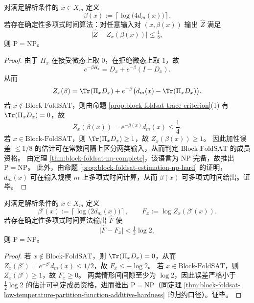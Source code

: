 \begin{theorem}[低温配分函数的常数加性精度近似强迫 \texorpdfstring{$P=NP$}{P=NP}]\label{thm:block-foldsat-low-temperature-partition-function-additive-hardness}
对满足解析条件的 \(x\in X_m\) 定义
\[
\beta(x):=\left\lceil\log\bigl(4d_m(x)\bigr)\right\rceil.
\]
若存在确定性多项式时间算法：对任意输入对 \((x,\beta(x))\) 输出 \(\widehat Z\) 满足
\[
\bigl|\widehat Z-Z_x(\beta(x))\bigr|\le \tfrac18,
\]
则 \(\mathrm{P}=\mathrm{NP}\)。
\end{theorem}
\begin{proof}
由于 \(H_x\) 在接受微态上取 \(0\)，在拒绝微态上取 \(1\)，故
\[
e^{-\beta H_x}=D_x+e^{-\beta}(I-D_x).
\]
从而
\[
Z_x(\beta)=\Tr(\Pi_xD_x)+e^{-\beta}\bigl(d_m(x)-\Tr(\Pi_xD_x)\bigr).
\]
若 \(x\notin\mathrm{Block}\text{-}\mathrm{FoldSAT}\)，则由命题 \ref{prop:block-foldsat-trace-criterion}(1) 有 \(\Tr(\Pi_xD_x)=0\)，故
\[
Z_x(\beta(x))=e^{-\beta(x)}d_m(x)\le \frac{1}{4}.
\]
若 \(x\in\mathrm{Block}\text{-}\mathrm{FoldSAT}\)，则 \(\Tr(\Pi_xD_x)\ge 1\)，故 \(Z_x(\beta(x))\ge 1\)。
因此加性误差 \(\le 1/8\) 的估计可在常数间隔上区分两类输入，从而判定 \(\mathrm{Block}\text{-}\mathrm{FoldSAT}\) 的成员资格。
由定理 \ref{thm:block-foldsat-np-complete}，该语言为 NP 完备，故推出 \(\mathrm{P}=\mathrm{NP}\)。
此外，由命题 \ref{prop:block-foldsat-estimation-np-hard} 的证明，\(d_m(x)\) 可在输入规模 \(m\) 上多项式时间计算，从而 \(\beta(x)\) 可多项式时间给出。证毕。
\end{proof}

\begin{corollary}[自由能的常数精度近似亦为 NP 困难]\label{cor:block-foldsat-free-energy-additive-hardness}
对满足解析条件的 \(x\in X_m\) 定义
\[
\beta'(x):=\left\lceil\log\bigl(2d_m(x)\bigr)\right\rceil,
\qquad
F_x:=\log Z_x(\beta'(x)).
\]
若存在确定性多项式时间算法输出 \(\widehat F\) 使
\[
\bigl|\widehat F-F_x\bigr|<\tfrac12\log 2,
\]
则 \(\mathrm{P}=\mathrm{NP}\)。
\end{corollary}
\begin{proof}
若 \(x\notin\mathrm{Block}\text{-}\mathrm{FoldSAT}\)，则 \(\Tr(\Pi_xD_x)=0\)，从而
\(
Z_x(\beta')=e^{-\beta'}d_m(x)\le 1/2
\)，故 \(F_x\le -\log 2\)。
若 \(x\in\mathrm{Block}\text{-}\mathrm{FoldSAT}\)，则 \(Z_x(\beta')\ge 1\)，故 \(F_x\ge 0\)。
两类情形间间隙至少为 \(\log 2\)，因此误差严格小于 \(\tfrac12\log 2\) 的估计可判定成员资格，进而推出 \(\mathrm{P}=\mathrm{NP}\)（同定理 \ref{thm:block-foldsat-low-temperature-partition-function-additive-hardness} 的归约口径）。证毕。
\end{proof}

